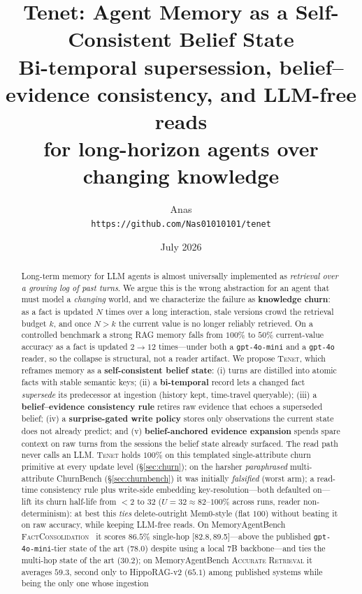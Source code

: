 \documentclass[11pt]{article}
\title{\textbf{Tenet: Agent Memory as a Self-Consistent Belief State}\\
\large Bi-temporal supersession, belief--evidence consistency, and LLM-free reads\\
for long-horizon agents over changing knowledge}
\author{Anas\\\small \texttt{https://github.com/Nas01010101/tenet}}
\date{July 2026}
\newcommand{\tenet}{\textsc{Tenet}}
\newcommand{\ci}[2]{{\footnotesize[#1,\,#2]}}
\begin{document}
\maketitle

\begin{abstract}
\noindent Long-term memory for LLM agents is almost universally implemented as
\emph{retrieval over a growing log of past turns}. We argue this is the wrong abstraction
for an agent that must model a \emph{changing} world, and we characterize the failure as
\textbf{knowledge churn}: as a fact is updated $N$ times over a long interaction, stale
versions crowd the retrieval budget $k$, and once $N>k$ the current value is no longer
reliably retrieved. On a controlled benchmark a strong RAG memory falls from $100\%$ to
$50\%$ current-value accuracy as a fact is updated $2\!\to\!12$ times---under both a
\texttt{gpt-4o-mini} and a \texttt{gpt-4o} reader, so the collapse is structural, not a
reader artifact. We propose \tenet{}, which reframes memory as a \textbf{self-consistent
belief state}: (i) turns are distilled into atomic facts with stable semantic keys;
(ii) a \textbf{bi-temporal} record lets a changed fact \emph{supersede} its predecessor at
ingestion (history kept, time-travel queryable); (iii) a \textbf{belief--evidence
consistency rule} retires raw evidence that echoes a superseded belief; (iv) a
\textbf{surprise-gated write policy} stores only observations the current state does not
already predict; and (v) \textbf{belief-anchored evidence expansion} spends spare context
on raw turns from the sessions the belief state already surfaced. The read path never
calls an LLM. \tenet{} holds $100\%$ on this templated single-attribute churn primitive at
every update level (\S\ref{sec:churn}); on the harsher \emph{paraphrased} multi-attribute
ChurnBench (\S\ref{sec:churnbench}) it was initially \emph{falsified} (worst arm); a
read-time consistency rule plus write-side embedding key-resolution---both defaulted
on---lift its churn half-life from ${<}2$ to $32$ ($U{=}32 \approx 82$--$100\%$ across
runs, reader non-determinism): at best this \emph{ties} delete-outright Mem0-style (flat
$100$) without beating it on raw accuracy, while keeping LLM-free reads. On
MemoryAgentBench \textsc{FactConsolidation}~\cite{mab} it scores $86.5\%$ single-hop
\ci{82.8}{89.5}---above the published \texttt{gpt-4o-mini}-tier state of the art
($78.0$) despite using a local 7B backbone---and ties the multi-hop state of the art
($30.2$); on MemoryAgentBench \textsc{Accurate Retrieval} it averages $59.3$, second only
to HippoRAG-v2 ($65.1$) among published systems while being the only one whose ingestion

\end{abstract}
\end{document}
